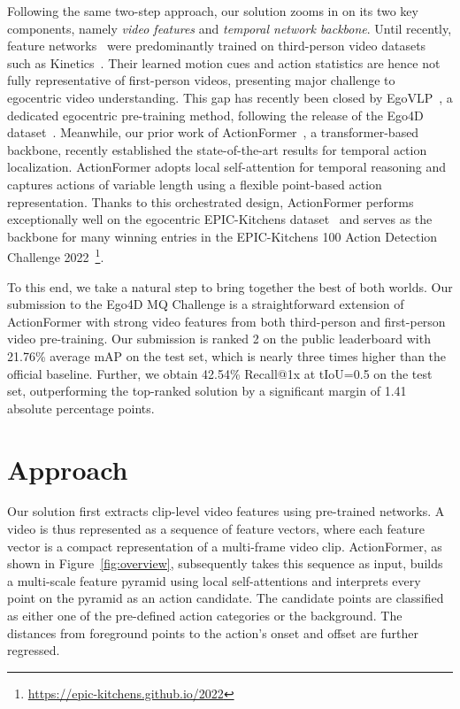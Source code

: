 \documentclass[runningheads]{llncs}
\begin{document}
Following the same two-step approach, our solution zooms in on its two key components, namely \textit{video features} and \textit{temporal network backbone}. Until recently, feature networks~\cite{Feichtenhofer_2019_ICCV,girdhar2022omnivore,arnab2021vivit,fan2021multiscale} were predominantly trained on third-person video datasets such as Kinetics~\cite{kay2017kinetics}. Their learned motion cues and action statistics are hence not fully representative of first-person videos, presenting major challenge to egocentric video understanding. This gap has recently been closed by EgoVLP~\cite{kevin2022egovlp}, a dedicated egocentric pre-training method, following the release of the Ego4D dataset~\cite{Ego4D2022CVPR}. Meanwhile, our prior work of ActionFormer~\cite{zhang2022actionformer}, a transformer-based backbone, recently established the state-of-the-art results for temporal action localization. ActionFormer adopts local self-attention for temporal reasoning and captures actions of variable length using a flexible point-based action representation. Thanks to this orchestrated design, ActionFormer performs exceptionally well on the egocentric EPIC-Kitchens dataset~\cite{Damen2022RESCALING} and serves as the backbone for many winning entries in the EPIC-Kitchens 100 Action Detection Challenge 2022~\footnote{\url{https://epic-kitchens.github.io/2022}}. 

To this end, we take a natural step to bring together the best of both worlds. Our submission to the Ego4D MQ Challenge is a straightforward extension of ActionFormer with strong video features from both third-person and first-person video pre-training. Our submission is ranked 2 on the public leaderboard with 21.76\% average mAP on the test set, which is nearly three times higher than the official baseline. Further, we obtain 42.54\% Recall@1x at tIoU=0.5 on the test set, outperforming the top-ranked solution by a significant margin of 1.41 absolute percentage points.

\section{Approach}

Our solution first extracts clip-level video features using pre-trained networks. A video is thus represented as a sequence of feature vectors, where each feature vector is a compact representation of a multi-frame video clip. ActionFormer, as shown in Figure~\ref{fig:overview}, subsequently takes this sequence as input, builds a multi-scale feature pyramid using local self-attentions and interprets every point on the pyramid as an action candidate. The candidate points are classified as either one of the pre-defined action categories or the background. The distances from foreground points to the action's onset and offset are further regressed.\smallskip
\end{document}
